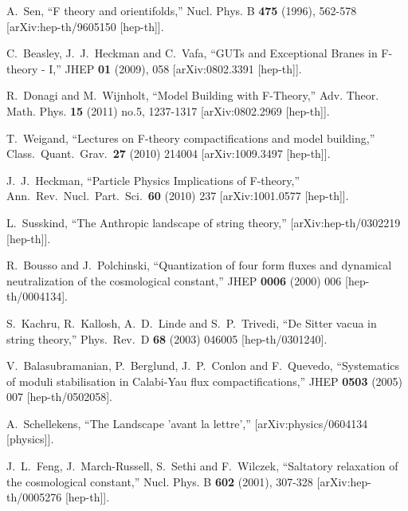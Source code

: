 \documentclass[12pt]{article}
\numberwithin{equation}{section}
\begin{document}
\begin{thebibliography}{999}
A.~Sen, ``F theory and orientifolds,''
Nucl. Phys. B \textbf{475} (1996), 562-578
[arXiv:hep-th/9605150 [hep-th]].

C.~Beasley, J.~J.~Heckman and C.~Vafa,
``GUTs and Exceptional Branes in F-theory - I,''
JHEP \textbf{01} (2009), 058
[arXiv:0802.3391 [hep-th]].

R.~Donagi and M.~Wijnholt,
``Model Building with F-Theory,''
Adv. Theor. Math. Phys. \textbf{15} (2011) no.5, 1237-1317
[arXiv:0802.2969 [hep-th]].

  T.~Weigand, ``Lectures on F-theory compactifications and model building,''
  Class.\ Quant.\ Grav.\  {\bf 27} (2010) 214004 [arXiv:1009.3497 [hep-th]].
  
  J.~J.~Heckman, ``Particle Physics Implications of F-theory,''
  Ann.\ Rev.\ Nucl.\ Part.\ Sci.\  {\bf 60} (2010) 237
  [arXiv:1001.0577 [hep-th]].

L.~Susskind, ``The Anthropic landscape of string theory,''
[arXiv:hep-th/0302219 [hep-th]].

  R.~Bousso and J.~Polchinski,
  ``Quantization of four form fluxes and dynamical neutralization of the cosmological constant,''
  JHEP {\bf 0006} (2000) 006
  [hep-th/0004134].

  S.~Kachru, R.~Kallosh, A.~D.~Linde and S.~P.~Trivedi,
  ``De Sitter vacua in string theory,''
  Phys.\ Rev.\ D {\bf 68} (2003) 046005
  [hep-th/0301240].

  V.~Balasubramanian, P.~Berglund, J.~P.~Conlon and F.~Quevedo,
  ``Systematics of moduli stabilisation in Calabi-Yau flux compactifications,''
  JHEP {\bf 0503} (2005) 007 [hep-th/0502058].
  
A.~Schellekens,
``The Landscape 'avant la lettre',''
[arXiv:physics/0604134 [physics]].  

J.~L.~Feng, J.~March-Russell, S.~Sethi and F.~Wilczek,
``Saltatory relaxation of the cosmological constant,''
Nucl. Phys. B \textbf{602} (2001), 307-328
[arXiv:hep-th/0005276 [hep-th]].


\end{thebibliography}
\end{document}
